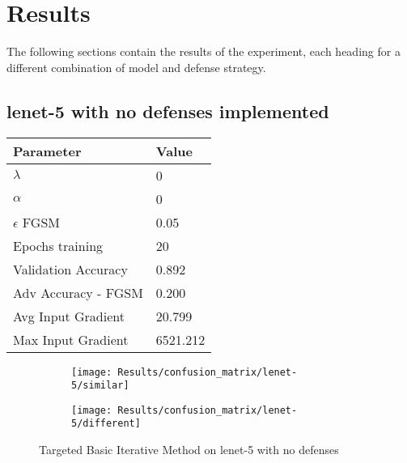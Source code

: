 \documentclass[draft,final]{vutinfth} %
\begin{document}
\section{Results}

The following sections contain the results of the experiment, each heading for a different combination of model and defense strategy.


\subsection{lenet-5 with no defenses implemented}

\begin{table}[h]
  \centering
  \begin{tabular}{ll}
    \toprule
			Parameter			& Value   \\
    \midrule
			$\lambda$								& 0				\\
			$\alpha$								& 0				\\
			$\epsilon$ FGSM					& 0.05		\\
			Epochs training					& 20			\\
			
			Validation Accuracy			& 0.892		\\ 
			Adv Accuracy - FGSM			& 0.200		\\
			
			Avg Input Gradient			& 20.799	\\
			Max Input Gradient			& 6521.212\\
    \bottomrule
  \end{tabular}
\end{table}


\begin{figure}[h]
  \begin{subfigure}[b]{0.5\columnwidth}
		\centering
    \texttt{[image: Results/confusion\_matrix/lenet-5/similar]}
    \label{fig:exp:cm:lenet-5:similar}
  \end{subfigure}
  \begin{subfigure}[b]{0.5\columnwidth}
		\centering
    \texttt{[image: Results/confusion\_matrix/lenet-5/different]}
    \label{fig:exp:cm:lenet-5:different}
  \end{subfigure}
  \caption{Targeted Basic Iterative Method on lenet-5 with no defenses}
  \label{fig:exp:cm:lenet-5}
\end{figure}
\clearpage
\end{document}
